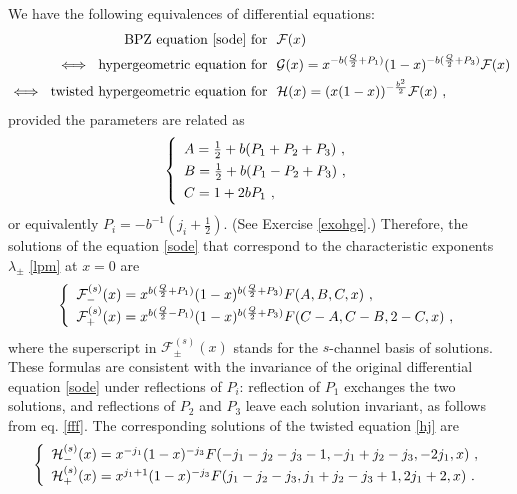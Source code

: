 \documentclass[12pt, a4paper, notitlepage, twoside]{report}
\numberwithin{equation}{section}
\theoremstyle{break}
\begin{document}
We have the following equivalences of differential equations:
\begin{align}
  \text{BPZ equation \eqref{sode} for\ \ } & \mathcal{F}(x)
\\ 
\iff\ \text{hypergeometric equation for\ \ }&  \mathcal{G}(x)= x^{-b(\frac{Q}{2}+P_1)}(1-x)^{-b(\frac{Q}{2}+P_3)}\mathcal{F}(x) 
\label{heg}
\\
\iff\  \text{twisted\ hypergeometric equation for\ \ }& \mathcal{H}(x)=(x(1-x))^{-\frac{b^2}{2}}\mathcal{F}(x) \ ,
\label{fgs}
\end{align}
provided the parameters are related as
\begin{align}
\renewcommand{\arraystretch}{1.3}
\left\{\begin{array}{l}   A = \frac12 + b(P_1+P_2+P_3) \ , \\
      B = \frac12 + b(P_1-P_2+P_3) \ , \\
      C = 1 + 2bP_1 \ ,
\end{array}\right. 
\label{abc}
\end{align}
or equivalently $P_i = -b^{-1}(j_i +\frac12)$.
(See Exercise \ref{exohge}.) 
Therefore, the solutions of the equation \eqref{sode} that correspond to the characteristic exponents $\lambda_\pm$ \eqref{lpm} at $x=0$ are 
\begin{align}
\renewcommand{\arraystretch}{1.3}
\left\{\begin{array}{l}  \mathcal{F}^{(s)}_-(x) = x^{b(\frac{Q}{2}+P_1)} (1-x)^{b(\frac{Q}{2}+P_3)} F(A,B,C,x)\ ,
\\ \mathcal{F}^{(s)}_+(x)   = x^{b(\frac{Q}{2}-P_1)} (1-x)^{b(\frac{Q}{2}+P_3)} F(C-A,C-B,2-C,x) \ ,
\end{array}\right. 
\label{gpm}
\end{align}
where the superscript in $\mathcal{F}^{(s)}_\pm(x)$ stands for the $s$-channel basis of solutions.
These formulas are consistent with the invariance of the original differential equation \eqref{sode} under reflections of $P_i$: reflection of $P_1$ exchanges the two solutions, and reflections of $P_2$ and $P_3$ leave each solution invariant, as follows from eq. \eqref{fff}.
The corresponding solutions of the twisted equation \eqref{hj} are 
\begin{align}
\renewcommand{\arraystretch}{1.3}
\left\{\begin{array}{l}  \mathcal{H}^{(s)}_-(x)  = x^{-j_1}(1-x)^{-j_3} F(-j_1-j_2-j_3-1,-j_1+j_2-j_3,-2j_1,x)\ ,
\\
 \mathcal{H}^{(s)}_+(x)  = x^{j_1+1}(1-x)^{-j_3} F(j_1-j_2-j_3,j_1+j_2-j_3+1,2j_1+2,x)\ .
\end{array}\right. 
\label{fpm}
\end{align}
\end{document}
